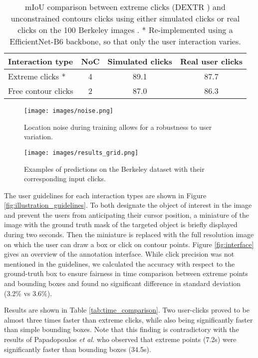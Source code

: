 \documentclass[letterpaper, 10 pt, conference]{ieeeconf}
\begin{document}
\begin{table}
    \centering
    \begin{tabular}{lccc}
        \hline
       Interaction type &
       NoC &
       Simulated clicks &
       Real user clicks \\
        \hline
        \hline
        Extreme clicks \cite{maninis18}* & 4 & 89.1 & 87.7 \\
        Free contour clicks & 2 & 87.0 & 86.3 \\
        \hline
    \end{tabular}
    \caption{mIoU comparison between extreme clicks (DEXTR \cite{maninis18}) and unconstrained contours clicks using either simulated clicks or real clicks on the 100 Berkeley images \cite{martin01}. * Re-implemented using a EfficientNet-B6 backbone, so that only the user interaction varies.}
    \label{tab:extreme_comparison}
\end{table}

\begin{figure}
    \centering
    \texttt{[image: images/noise.png]}
    \caption{Location noise during training allows for a robustness to user variation.}
    \label{fig:noise}
\end{figure}

\begin{figure*}
    \centering
    \texttt{[image: images/results\_grid.png]}
    \caption{Examples of predictions on the Berkeley dataset \cite{martin01} with their corresponding input clicks.}
    \label{fig:predictions}
\end{figure*}
The user guidelines for each interaction types are shown in Figure \ref{fig:illustration_guidelines}. To both designate the object of interest in the image and prevent the users from anticipating their cursor position, a miniature of the image with the ground truth mask of the targeted object is briefly displayed during two seconds. Then the miniature is replaced with the full resolution image on which the user can draw a box or click on contour points. Figure \ref{fig:interface} gives an overview of the annotation interface. While click precision was not mentioned in the guidelines, we calculated the accuracy with respect to the ground-truth box to ensure fairness in time comparison between extreme points and bounding boxes and found no significant difference in standard deviation (3.2\% vs 3.6\%).

Results are shown in Table \ref{tab:time_comparison}. Two user-clicks proved to be almost three times faster than extreme clicks, while also being significantly faster than simple bounding boxes. Note that this finding is contradictory with the results of Papadopoulos \textit{et al.} \cite{papadopoulos17} who observed that extreme points (7.2s) were significantly faster than bounding boxes (34.5s).
\end{document}
